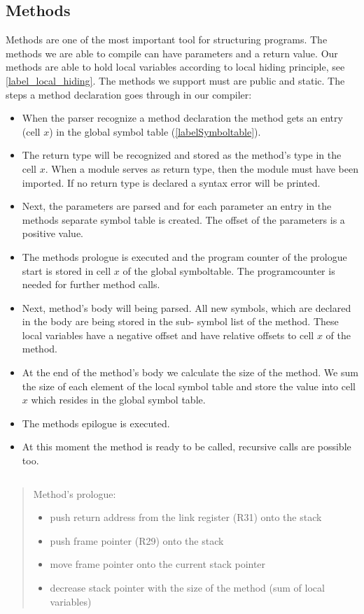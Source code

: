 \subsection{Methods}
Methods are one of the most important tool for structuring programs. The methods we are able to compile can have parameters and a return
value. Our methods are able to hold local variables according to local hiding principle, see \ref{label_local_hiding}. The methods we
support must are public and static. The steps a method declaration goes through in our compiler:
\begin{itemize}
  \item When the parser recognize a method declaration the method gets an entry (cell $x$) in the global symbol table (\ref{labelSymboltable}).
  \item The return type will be recognized and stored as the method's type in the cell $x$. When a module serves as return
  type, then the module must have been imported. If no return type is declared a syntax error will be printed.
  \item Next, the parameters are parsed and for each parameter an entry in the methods separate symbol table is created. The offset of the
  parameters is a positive value. 
  \item The methods prologue is executed and the program counter of the prologue start is stored in cell $x$ of the global
  symboltable. The programcounter is needed for further method calls. 
  \item Next, method's body will being parsed. All new symbols, which are declared in the body are being stored in the sub- symbol list of
  the method. These local variables have a negative offset and have relative offsets to cell $x$ of the method.
  \item At the end of the method's body we calculate the size of the method. We sum the size of each element of the local symbol table and
  store the value into cell $x$ which resides in the global symbol table.
  \item The methods epilogue is executed.
  \item At this moment the method is ready to be called, recursive calls are possible too.
\end{itemize}
\begin{verbatim}

\end{verbatim}
\begin{quote}
Method's prologue: \\
\begin{itemize}
  \item push return address from the link register (R31) onto the stack
  \item push frame pointer (R29) onto the stack
  \item move frame pointer onto the current stack pointer
  \item decrease stack pointer with the size of the method (sum of local variables) 
\end{itemize}
\end{quote}
\begin{verbatim}

\end{verbatim}

